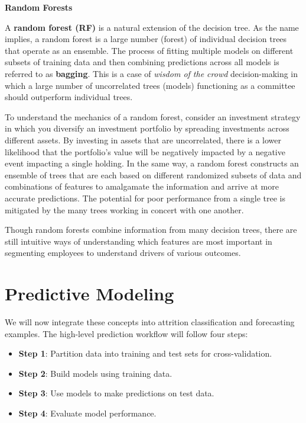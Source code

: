 \documentclass[
]{book}
\providecommand{\tightlist}{%
  \setlength{\itemsep}{0pt}\setlength{\parskip}{0pt}}
\begin{document}
\textbf{Random Forests}

A \textbf{random forest (RF)} is a natural extension of the decision tree. As the name implies, a random forest is a large number (forest) of individual decision trees that operate as an ensemble. The process of fitting multiple models on different subsets of training data and then combining predictions across all models is referred to as \textbf{bagging}. This is a case of \emph{wisdom of the crowd} decision-making in which a large number of uncorrelated trees (models) functioning as a committee should outperform individual trees.

To understand the mechanics of a random forest, consider an investment strategy in which you diversify an investment portfolio by spreading investments across different assets. By investing in assets that are uncorrelated, there is a lower likelihood that the portfolio's value will be negatively impacted by a negative event impacting a single holding. In the same way, a random forest constructs an ensemble of trees that are each based on different randomized subsets of data and combinations of features to amalgamate the information and arrive at more accurate predictions. The potential for poor performance from a single tree is mitigated by the many trees working in concert with one another.

Though random forests combine information from many decision trees, there are still intuitive ways of understanding which features are most important in segmenting employees to understand drivers of various outcomes.

\hypertarget{predictive-modeling}{%
\section{Predictive Modeling}\label{predictive-modeling}}

We will now integrate these concepts into attrition classification and forecasting examples. The high-level prediction workflow will follow four steps:

\begin{itemize}
\tightlist
\item
  \textbf{Step 1}: Partition data into training and test sets for cross-validation.
\item
  \textbf{Step 2}: Build models using training data.
\item
  \textbf{Step 3}: Use models to make predictions on test data.
\item
  \textbf{Step 4}: Evaluate model performance.
\end{itemize}
\end{document}
